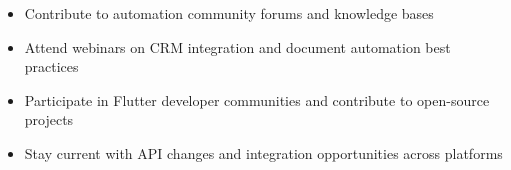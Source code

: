 \documentclass[11pt,a4paper]{article}
\begin{document}
\begin{minipage}[t]{0.65\textwidth}
    \begin{itemize}[leftmargin=1.5em, itemsep=3pt, label=\textcolor{mainblue}{\footnotesize\faGraduationCap}]
        \item Contribute to automation community forums and knowledge bases
        \item Attend webinars on CRM integration and document automation best practices
        \item Participate in Flutter developer communities and contribute to open-source projects
        \item Stay current with API changes and integration opportunities across platforms
    \end{itemize}
\end{minipage}
\end{document}
